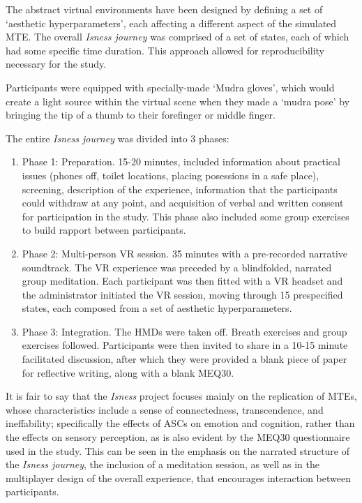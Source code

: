 The abstract virtual environments have been designed by defining a set of `aesthetic hyperparameters', each affecting a different aspect of the simulated \ac{MTE}. The overall \textit{Isness journey} was comprised of a set of states, each of which had some specific time duration. This approach allowed for reproducibility necessary for the study.

Participants were equipped with specially-made `Mudra gloves', which would create a light source within the virtual scene when they made a `mudra pose' by bringing the tip of a thumb to their forefinger or middle finger.

The entire \textit{Isness journey} was divided into 3 phases:

\begin{enumerate}
    \item Phase 1: Preparation. 15-20 minutes, included information about practical issues (phones off, toilet locations, placing posessions in a safe place), screening, description of the experience, information that the participants could withdraw at any point, and acquisition of verbal and written consent for participation in the study. This phase also included some group exercises to build rapport between participants.
    \item Phase 2: Multi-person \ac{VR} session. 35 minutes with a pre-recorded narrative soundtrack. The \ac{VR} experience was preceded by a blindfolded, narrated group meditation. Each participant was then fitted with a VR headset and the administrator initiated the \ac{VR} session, moving through 15 prespecified states, each composed from a set of aesthetic hyperparameters.
    \item Phase 3: Integration. The \acp{HMD} were taken off. Breath exercises and group exercises followed. Participants were then invited to share in a 10-15 minute facilitated discussion, after which they were provided a blank piece of paper for reflective writing, along with a blank \ac{MEQ30}.
\end{enumerate}

It is fair to say that the \textit{Isness} project focuses mainly on the replication of \acp{MTE}, whose characteristics include a sense of connectedness, transcendence, and ineffability; specifically the effects of \acp{ASC} on emotion and cognition, rather than the effects on sensory perception, as is also evident by the \ac{MEQ30} questionnaire used in the study. This can be seen in the emphasis on the narrated structure of the \textit{Isness journey}, the inclusion of a meditation session, as well as in the multiplayer design of the overall experience, that encourages interaction between participants.

